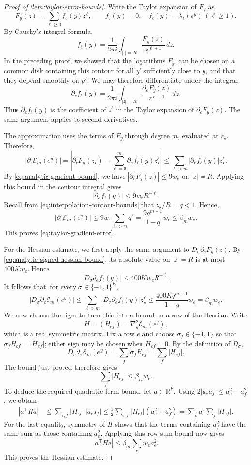 \documentclass[11pt,reqno,letterpaper]{amsart}
\numberwithin{equation}{section}
\theoremstyle{definition}
\theoremstyle{remark}
\newcommand{\R}{\mathbb R}
\begin{document}
\begin{proof}[Proof of \cref{lem:taylor-error-bounds}]
Write the Taylor expansion of $F_y$ as
\[
 F_y(z)=\sum_{\ell\ge0}f_\ell(y)z^\ell,
 \qquad f_0(y)=0,\quad f_\ell(y)=\lambda_\ell(e^y)\ (\ell\ge1).
\]
By Cauchy's integral formula,
\[
 f_\ell(y)
 =\frac{1}{2\pi i}\int_{|z|=R}
       \frac{F_y(z)}{z^{\ell+1}}\,dz.
\]
In the preceding proof, we showed that the logarithms $F_{y'}$
can be chosen on a common disk containing this contour for all
$y'$ sufficiently close to $y$, and that they depend smoothly
on $y'$. We may therefore differentiate under the integral:
\[
 \partial_e f_\ell(y)
 =\frac{1}{2\pi i}\int_{|z|=R}
       \frac{\partial_eF_y(z)}{z^{\ell+1}}\,dz.
\]
Thus $\partial_e f_\ell(y)$ is the coefficient of $z^\ell$
in the Taylor expansion of $\partial_eF_y(z)$. The same argument
applies to second derivatives.

The approximation uses the terms of $F_y$ through degree $m$,
evaluated at $z_\star$. Therefore,
\[
 |\partial_e\mathcal E_m(e^y)|
 =\left|\partial_eF_y(z_\star)
       -\sum_{\ell=0}^m\partial_e f_\ell(y)z_\star^\ell\right|
 \le\sum_{\ell>m}|\partial_e f_\ell(y)|z_\star^\ell.
\]
By \cref{eq:analytic-gradient-bound}, we have
$|\partial_eF_y(z)|\le9w_e$ on $|z|=R$. Applying this bound
in the contour integral gives
\[
 |\partial_e f_\ell(y)|\le9w_eR^{-\ell}.
\]
Recall from \cref{eq:interpolation-contour-bounds} that $z_\star/R=q<1$.
Hence,
\[
 |\partial_e\mathcal E_m(e^y)|
 \le9w_e\sum_{\ell>m}q^\ell
 =\frac{9q^{m+1}}{1-q}w_e
 \le\beta_mw_e.
\]
This proves \cref{eq:taylor-gradient-error}.

For the Hessian estimate, we first apply the same argument to
$D_\sigma\partial_eF_y(z)$. By
\cref{eq:analytic-signed-hessian-bound}, its absolute value on
$|z|=R$ is at most $400K w_e$. Hence
\[
 |D_\sigma\partial_e f_\ell(y)|
 \le400K w_eR^{-\ell}.
\]
It follows that, for every $\sigma\in\{-1,1\}^E$,
\[
 |D_\sigma\partial_e\mathcal E_m(e^y)|
 \le\sum_{\ell>m}|D_\sigma\partial_e f_\ell(y)|z_\star^\ell
 \le\frac{400Kq^{m+1}}{1-q}w_e
 =\beta_mw_e.
\]
We now choose the signs to turn this into a bound on a row of
the Hessian. Write
\[
 H=(H_{ef})=\nabla_y^2\mathcal E_m(e^y),
\]
which is a real symmetric matrix. Fix a row $e$ and choose
$\sigma_f\in\{-1,1\}$ so that $\sigma_fH_{ef}=|H_{ef}|$;
either sign may be chosen when $H_{ef}=0$. By the definition
of $D_\sigma$,
\[
 D_\sigma\partial_e\mathcal E_m(e^y)
 =\sum_f\sigma_fH_{ef}
 =\sum_f|H_{ef}|.
\]
The bound just proved therefore gives
\begin{equation*}
 \sum_f|H_{ef}|\le\beta_mw_e.
\end{equation*}
To deduce the required quadratic-form bound, let $a\in\R^E$.
Using $2|a_ea_f|\le a_e^2+a_f^2$, we obtain
\begin{align*}
 |a^{\mathsf T}Ha|
 &\le\sum_{e,f}|H_{ef}|\,|a_ea_f| \le\frac12\sum_{e,f}|H_{ef}|(a_e^2+a_f^2) =\sum_ea_e^2\sum_f|H_{ef}|.
\end{align*}
For the last equality, symmetry of $H$ shows that the terms
containing $a_f^2$ have the same sum as those containing $a_e^2$.
Applying this row-sum bound now gives
\[
 |a^{\mathsf T}Ha|
 \le\beta_m\sum_e w_ea_e^2.
\]
This proves the Hessian estimate.


\end{proof}
\end{document}
